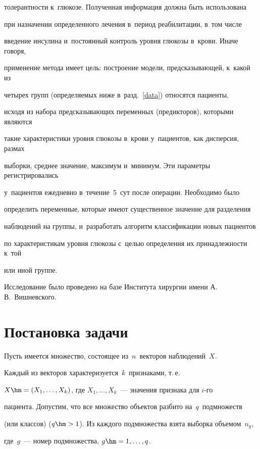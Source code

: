 толерантности к~глюкозе.  Полученная информация должна быть использована 

при назначении определенного лечения в~период реабилитации, в~том числе 

введение инсулина и~постоянный контроль уровня глюкозы в~крови. Иначе говоря, 

применение метода имеет цель: построение модели, предсказывающей, к~какой из 

четырех групп (определяемых ниже в~разд.~\ref{data}) относятся пациенты, 

исходя из набора предсказывающих переменных (предикторов), которыми являются 

такие характеристики уровня глюкозы в~крови у~пациентов, как дисперсия, размах 

выборки, среднее значение, максимум и~минимум. Эти параметры регистрировались 

у~пациентов ежедневно в~течение~5~сут после операции. Необходимо было 

определить переменные, которые имеют существенное значение для разделения 

наблюдений на группы, и~разработать алгоритм классификации новых пациентов 

по характеристикам уровня глюкозы с~целью определения их принадлежности к~той 

или иной группе.



Исследование было проведено на базе Института хирургии имени А.\,В.~Вишневского.



\section{Постановка задачи}



Пусть имеется множество, состоящее из~$n$~векторов наблюдений~$X$. 

Каж\-дый из векторов характеризуется~$k$~признаками, т.\,е.\

 $X \hm= (X_1,\ldots,X_k)$, где $X_1,\ldots,X_k$~--- значения признака для $i$-го 

 пациента. Допустим, что все множество объектов разбито на~$q$~подмножеств 

 (или классов) ($q\hm>1$). Из каждого подмножества взята выборка объемом~$n_g$, 

 где~$g$~--- номер подмножества, $g \hm= 1,\ldots, q$.



